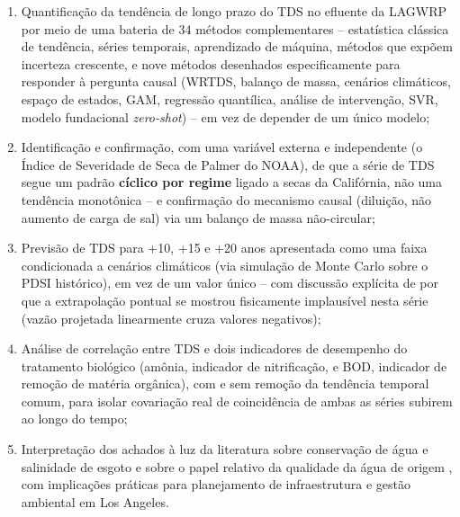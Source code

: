 \begin{enumerate}
    \item Quantificação da tendência de longo prazo do TDS no efluente da LAGWRP por meio de uma bateria de 34 métodos complementares -- estatística clássica de tendência, séries temporais, aprendizado de máquina, métodos que expõem incerteza crescente, e nove métodos desenhados especificamente para responder à pergunta causal (WRTDS, balanço de massa, cenários climáticos, espaço de estados, GAM, regressão quantílica, análise de intervenção, SVR, modelo fundacional \textit{zero-shot}) -- em vez de depender de um único modelo;
    \item Identificação e confirmação, com uma variável externa e independente (o Índice de Severidade de Seca de Palmer do NOAA), de que a série de TDS segue um padrão \textbf{cíclico por regime} ligado a secas da Califórnia, não uma tendência monotônica -- e confirmação do mecanismo causal (diluição, não aumento de carga de sal) via um balanço de massa não-circular;
    \item Previsão de TDS para +10, +15 e +20 anos apresentada como uma faixa condicionada a cenários climáticos (via simulação de Monte Carlo sobre o PDSI histórico), em vez de um valor único -- com discussão explícita de por que a extrapolação pontual se mostrou fisicamente implausível nesta série (vazão projetada linearmente cruza valores negativos);
    \item Análise de correlação entre TDS e dois indicadores de desempenho do tratamento biológico (amônia, indicador de nitrificação, e BOD, indicador de remoção de matéria orgânica), com e sem remoção da tendência temporal comum, para isolar covariação real de coincidência de ambas as séries subirem ao longo do tempo;
    \item Interpretação dos achados à luz da literatura sobre conservação de água e salinidade de esgoto \cite{schwabe2020unintended} e sobre o papel relativo da qualidade da água de origem \cite{scsc2018tds}, com implicações práticas para planejamento de infraestrutura e gestão ambiental em Los Angeles.
\end{enumerate}
